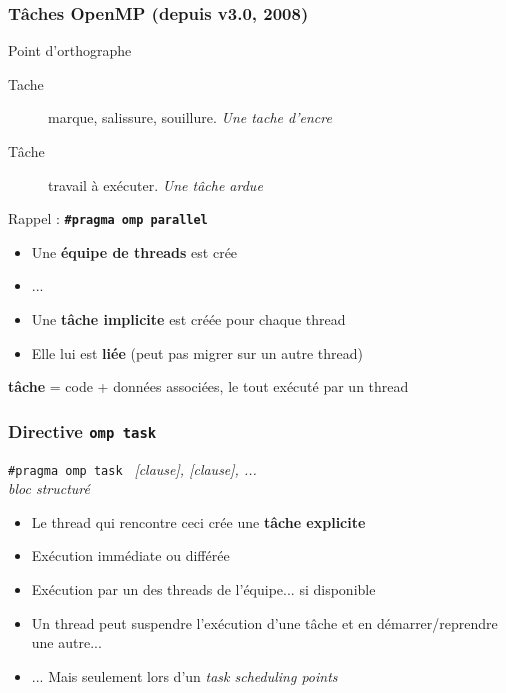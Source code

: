 \documentclass{beamer}
\begin{document}

\begin{frame}
  \frametitle{Tâches OpenMP (depuis v3.0, 2008)}

  \begin{alertblock}{Point d'orthographe}
  \begin{description}
    \item[Tache] marque, salissure, souillure. \textit{Une tache d'encre}
    \item[Tâche] travail à exécuter. \textit{Une tâche ardue}
    \end{description}
  \end{alertblock}

  \pause
  
  \begin{block}{\og Rappel\fg{} : \bf \texttt{\#pragma omp parallel}}
    \begin{itemize}
    \item Une \alert{\textbf{équipe de threads}} est crée
    \item ...
    \item Une \alert{\textbf{tâche implicite}} est créée pour chaque thread
    \item Elle lui est \textbf{liée} (peut pas migrer sur un autre thread)
    \end{itemize}
  \end{block}
  
  \medskip
  
  \textbf{tâche} = code + données associées, le tout exécuté par un thread
\end{frame}


\begin{frame}
  \frametitle{Directive \texttt{omp task}}

  \begin{framed}
  {\tt \#pragma omp task } {\it [clause], [clause], ...}  \\
  {\it bloc structuré} 
\end{framed}

\begin{itemize}
\item Le thread qui rencontre ceci crée une \textbf{tâche explicite}
\item Exécution \alert{immédiate} ou \alert{différée}
\item Exécution par un des threads de l'équipe... si disponible
\pause
\item Un thread peut suspendre l'exécution d'une tâche et en démarrer/reprendre
  une autre...
  \item ... Mais seulement lors d'un \emph{task scheduling points}
\end{itemize}
\end{frame}
\end{document}
